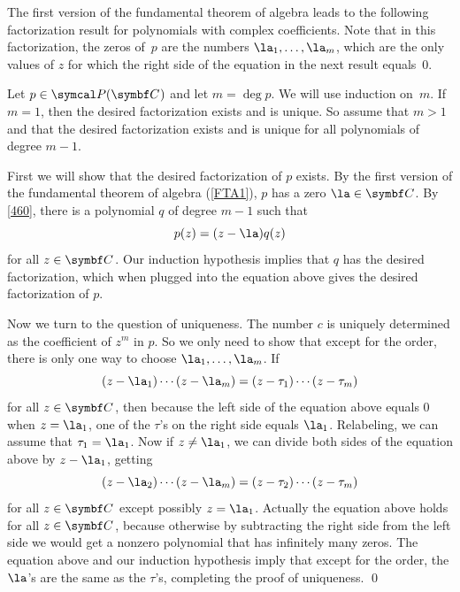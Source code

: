 The first version of the fundamental theorem of algebra leads to the following factorization
result for polynomials with complex coefficients.  Note that in this
factorization, the zeros of~$p$ are the numbers $\la_1, \dots, \la_m$,
which are the only values of $z$ for which the right side of the equation in the next result equals~$0$.


\proof
Let $p \in \P(\C{})$ and let $m = \deg p$.  We will use induction
on~$m$.  If $m = 1$, then the desired factorization exists and is unique.
So assume that $m > 1$ and that the desired factorization exists and is unique
for all polynomials of degree $m-1$.

First we will show that the desired factorization of $p$ exists.  By the
first version of the fundamental theorem of algebra (\ref{FTA1}), $p$ has a zero $\la \in \C{}$.  By
\ref{460}, there is a polynomial $q$ of degree $m-1$ such that
\[
p(z) = (z - \la) q(z)
\]
for all $z \in \C{}$.  Our induction hypothesis implies that $q$ has the desired factorization, which when  plugged into the equation above gives the desired factorization of $p$.

Now we turn to the question of uniqueness.  The number $c$ is uniquely determined as the coefficient of $z^m$ in $p$.  So we only need
to show that except for the order, there is only one way to choose $\la_1, \dots, \la_m$. If
\[
(z - \la_1) \dotsm (z - \la_m) =
(z - \tau_1) \dotsm (z - \tau_m)
\]
for all $z \in \C{}$, then because the left side of the equation above equals $0$ when $z = \la_1$, one of the $\tau$'s on the right side equals $\la_1$. Relabeling, we can assume that $\tau_1 = \la_1$.  Now if $z  \ne \la_1$, we can divide both sides of the equation above by $z - \la_1$, getting
\vspace{-.04in}
\[
(z - \la_2) \dotsm (z - \la_m) =
(z - \tau_2) \dotsm (z - \tau_m)
\]
for all $z \in \C{}$ except possibly $z = \la_1$.  Actually the equation above holds for all $z \in \C{}$, because otherwise by subtracting the right side from the left side we would get a nonzero polynomial that has infinitely many zeros.  The equation above and our induction hypothesis imply that except for the order, the $\la$'s are the same as the $\tau$'s, completing the proof of uniqueness.
\qed

